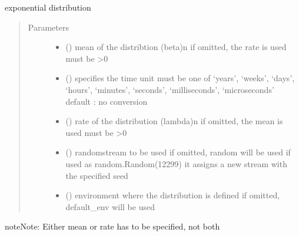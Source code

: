 \documentclass[letterpaper,10pt,english]{sphinxmanual}
\begin{document}
\begin{fulllineitems}
\label{\detokenize{Reference:salabim.Exponential}}
exponential distribution
\begin{quote}\begin{description}
\item[{Parameters}] \leavevmode\begin{itemize}
\item {} 
 () \textendash{} mean of the distribtion (beta)\textbar{}n\textbar{}
if omitted, the rate is used 
must be \textgreater{}0

\item {} 
 () \textendash{} specifies the time unit 
must be one of ‘years’, ‘weeks’, ‘days’, ‘hours’, ‘minutes’, ‘seconds’, ‘milliseconds’, ‘microseconds’ 
default : no conversion 

\item {} 
 () \textendash{} rate of the distribution (lambda)\textbar{}n\textbar{}
if omitted, the mean is used 
must be \textgreater{}0

\item {} 
 () \textendash{} randomstream to be used 
if omitted, random will be used 
if used as random.Random(12299)
it assigns a new stream with the specified seed

\item {} 
 ({\hyperref[\detokenize{Reference:salabim.Environment}]{}}) \textendash{} environment where the distribution is defined 
if omitted, default\_env will be used

\end{itemize}

\end{description}\end{quote}

\begin{sphinxadmonition}{note}{Note:}
Either mean or rate has to be specified, not both
\end{sphinxadmonition}


\end{fulllineitems}
\end{document}

